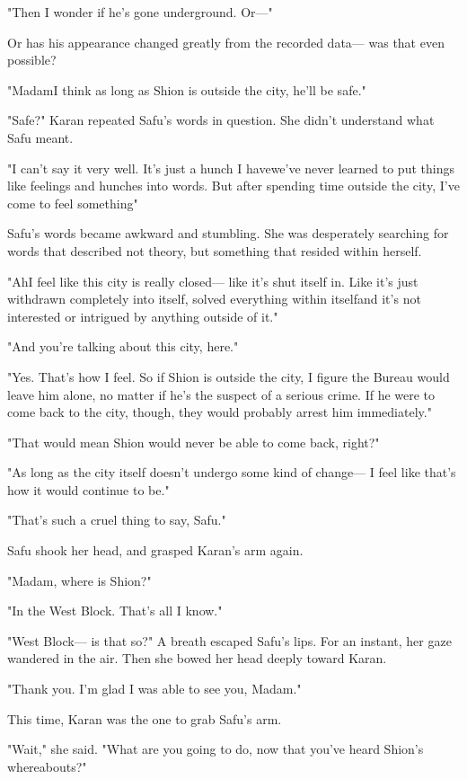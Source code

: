 "Then I wonder if he's gone underground. Or---"

Or has his appearance changed greatly from the recorded data--- was that
even possible?

"Madam\el I think as long as Shion is outside the city, he'll be safe."

"Safe?" Karan repeated Safu's words in question. She didn't understand
what Safu meant.

"I can't say it very well. It's just a hunch I have\el we've never
learned to put things like feelings and hunches into words. But after
spending time outside the city, I've come to feel something\el "

Safu's words became awkward and stumbling. She was desperately searching
for words that described not theory, but something that resided within
herself.

"Ah\el I feel like this city is really closed--- like it's shut itself in.
Like it's just withdrawn completely into itself, solved everything
within itself\el and it's not interested or intrigued by anything
outside of it."

"And you're talking about this city, here."

"Yes. That's how I feel. So if Shion is outside the city, I figure the
Bureau would leave him alone, no matter if he's the suspect of a serious
crime. If he were to come back to the city, though, they would probably
arrest him immediately."

"That would mean Shion would never be able to come back, right?"

"As long as the city itself doesn't undergo some kind of change--- I feel
like that's how it would continue to be."

"That's such a cruel thing to say, Safu."

Safu shook her head, and grasped Karan's arm again.

"Madam, where is Shion?"

"In the West Block. That's all I know."

"West Block--- is that so?" A breath escaped Safu's lips. For an instant,
her gaze wandered in the air. Then she bowed her head deeply toward
Karan.

"Thank you. I'm glad I was able to see you, Madam."

This time, Karan was the one to grab Safu's arm.

"Wait," she said. "What are you going to do, now that you've heard
Shion's whereabouts?"

